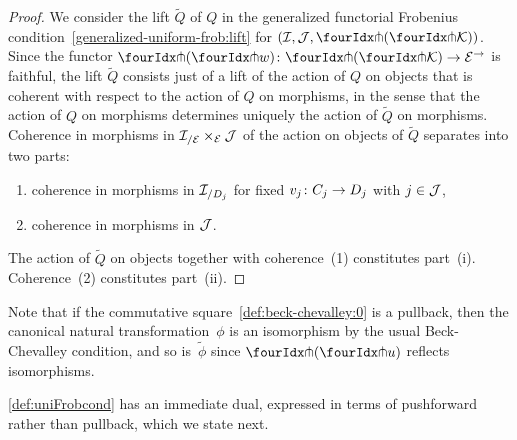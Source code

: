 \documentclass[reqno,10pt,a4paper,oneside,draft]{amsart}
\begin{document}
{{\begin{proof}
We consider the lift $\widetilde{Q}$ of $Q$ in the generalized functorial Frobenius condition~\eqref{generalized-uniform-frob:lift} for $(\cal{I}, \cal{J}, \liftl{(\liftr{\cal{K}})})$.
Since the functor $\liftl{(\liftr{w})} \co \liftl{(\liftr{\cal{K}})} \to \cal{E}^\to$ is faithful, the lift $\widetilde{Q}$ consists just of a lift of the action of $Q$ on objects that is coherent with respect to the action of $Q$ on morphisms, in the sense that the action of $Q$ on morphisms determines uniquely the action of $\widetilde{Q}$ on morphisms.
Coherence in morphisms in $\cal{I}_{/\cal{E}} \times_{\cal{E}} \cal{J}$ of the action on objects of $\widetilde{Q}$ separates into two parts:
\begin{enumerate}[(1)]
\item coherence in morphisms in $\cal{I}_{/D_j}$ for fixed $v_j \co C_j \to D_j$ with $j \in \cal{J}$,
\item coherence in morphisms in $\cal{J}$.
\end{enumerate}
The action of $\widetilde{Q}$ on objects together with coherence~(1) constitutes part~(i).
Coherence~(2) constitutes part~(ii).
\end{proof}

Note that if the commutative square~\eqref{def:beck-chevalley:0} is a pullback, then the canonical natural transformation~$\phi$ is an isomorphism by the usual Beck-Chevalley condition, and so is~$\tilde{\phi}$ since $\liftl{(\liftr{u})}$ reflects isomorphisms.

\cref{def:uniFrobcond} has an immediate dual, expressed in terms of pushforward rather than pullback, which we state next.

}}
\end{document}
